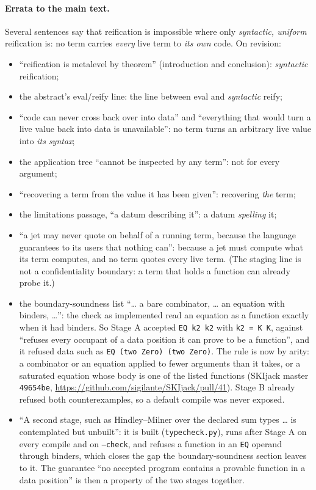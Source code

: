\paragraph{Errata to the main text.}  Several sentences say that reification is
impossible where only \emph{syntactic, uniform} reification is: no term carries
\emph{every} live term to \emph{its own} code.  On revision:
\begin{itemize}
\item ``reification is metalevel by theorem'' (introduction and conclusion):
  \emph{syntactic} reification;
\item the abstract's eval/reify line: the line between eval and \emph{syntactic}
  reify;
\item ``code can never cross back over into data'' and ``everything that would
  turn a live value back into data is unavailable'': no term turns an
  arbitrary live value into \emph{its syntax};
\item the application tree ``cannot be inspected by any term'': not for every
  argument;
\item ``recovering a term from the value it has been given'': recovering
  \emph{the} term;
\item the limitations passage, ``a datum describing it'': a datum
  \emph{spelling} it;
\item ``a jet may never quote on behalf of a running term, because the language
  guarantees to its users that nothing can'': because a jet must compute what
  its term computes, and no term quotes every live term.  (The staging line is
  not a confidentiality boundary: a term that holds a function can already
  probe it.)
\item the boundary-soundness list ``\ldots{} a bare combinator, \ldots{} an
  equation with binders, \ldots'': the check as implemented read an equation
  as a function exactly when it had binders.  So Stage A accepted \texttt{EQ k2
  k2} with \texttt{k2 = K K}, against ``refuses every occupant of a data
  position it can prove to be a function'', and it refused data such as
  \texttt{EQ (two Zero) (two Zero)}.  The rule is now by arity: a combinator or
  an equation applied to fewer arguments than it takes, or a saturated
  equation whose body is one of the listed functions
  (SKIjack master \texttt{49654be},
  \url{https://github.com/sigilante/SKIjack/pull/41}).  Stage B already refused
  both counterexamples, so a default compile was never exposed.
\item ``A second stage, such as Hindley--Milner over the declared sum types
  \ldots{} is contemplated but unbuilt'': it is built (\texttt{typecheck.py}),
  runs after Stage A on every compile and on \texttt{--check}, and refuses a
  function in an \texttt{EQ} operand through binders, which closes the gap the
  boundary-soundness section leaves to it.  The guarantee ``no accepted program
  contains a provable function in a data position'' is then a property of the
  two stages together.
\end{itemize}

